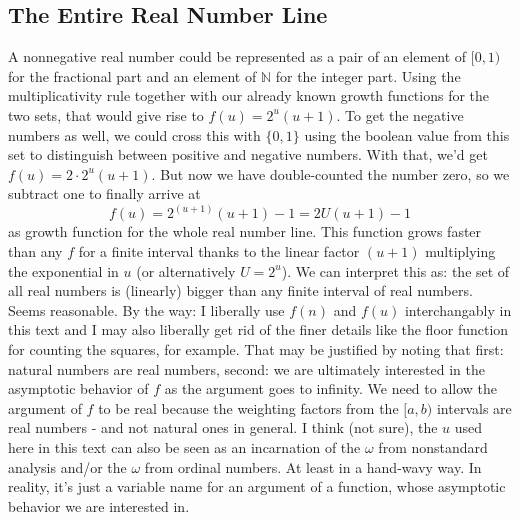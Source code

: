 \documentclass[12pt]{article}
\begin{document}
\subsection{The Entire Real Number Line}
A nonnegative real number could be represented as a pair of an element of $[0,1)$ for the fractional part and an element of $\mathbb{N}$ for the integer part. Using the multiplicativity rule together with our already known growth functions for the two sets, that would give rise to $f(u) = 2^u (u+1)$. To get the negative numbers as well, we could cross this with $\{0,1\}$ using the boolean value from this set to distinguish between positive and negative numbers. With that, we'd get $f(u) = 2 \cdot 2^u (u+1)$. But now we have double-counted the number zero, so we subtract one to finally arrive at
\begin{equation}
 f(u) = 2^{(u+1)} (u+1) - 1 = 2 U (u+1) - 1
\end{equation}
as growth function for the whole real number line. This function grows faster than any $f$ for a finite interval thanks to the linear factor $(u+1)$ multiplying the exponential in $u$ (or alternatively $U = 2^u$). We can interpret this as: the set of all real numbers is (linearly) bigger than any finite interval of real numbers. Seems reasonable. By the way: I liberally use $f(n)$ and $f(u)$ interchangably in this text and I may also liberally get rid of the finer details like the floor function for counting the squares, for example. That may be justified by noting that first: natural numbers are real numbers, second: we are ultimately interested in the asymptotic behavior of $f$ as the argument goes to infinity. We need to allow the argument of $f$ to be real because the weighting factors from the $[a,b)$ intervals are real numbers - and not natural ones in general. I think (not sure), the $u$ used here in this text can also be seen as an incarnation of the $\omega$ from nonstandard analysis and/or the $\omega$ from ordinal numbers. At least in a hand-wavy way. In reality, it's just a variable name for an argument of a function, whose asymptotic behavior we are interested in.
\end{document}

